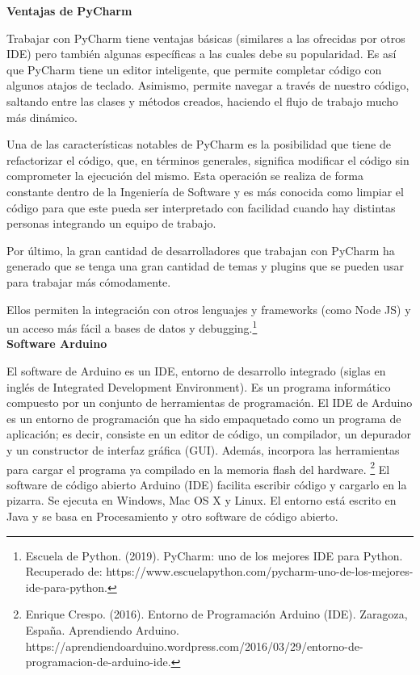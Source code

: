 \documentclass[12pt]{report}%
\begin{document}
\textbf {Ventajas de PyCharm}

Trabajar con PyCharm tiene ventajas básicas (similares a las ofrecidas por otros IDE) pero también algunas específicas a las cuales debe su popularidad. Es así que PyCharm tiene un editor inteligente, que permite completar código con algunos atajos de teclado. Asimismo, permite navegar a través de nuestro código, saltando entre las clases y métodos creados, haciendo el flujo de trabajo mucho más dinámico.

Una de las características notables de PyCharm es la posibilidad que tiene de refactorizar el código, que, en términos generales, significa modificar el código sin comprometer la ejecución del mismo.
Esta operación se realiza de forma constante dentro de la Ingeniería de Software y es más conocida como limpiar el código para que este pueda ser interpretado con facilidad cuando hay distintas personas integrando un equipo de trabajo.

Por último, la gran cantidad de desarrolladores que trabajan con PyCharm ha generado que se tenga una gran cantidad de temas y plugins que se pueden usar para trabajar más cómodamente.

Ellos permiten la integración con otros lenguajes y frameworks (como Node JS) y un acceso más fácil a bases de datos y debugging.\footnote{Escuela de Python. (2019). PyCharm: uno de los mejores IDE para Python. Recuperado de: https://www.escuelapython.com/pycharm-uno-de-los-mejores-ide-para-python.}\\


\textbf{Software Arduino}

El software de Arduino es un IDE, entorno de desarrollo integrado (siglas en inglés de Integrated Development Environment). Es un programa informático compuesto por un conjunto de herramientas de programación. El IDE de Arduino es un entorno de programación que ha sido empaquetado como un programa de aplicación; es decir, consiste en un editor de código, un compilador, un depurador y un constructor de interfaz gráfica (GUI). Además, incorpora las herramientas para cargar el programa ya compilado en la memoria flash del hardware. \footnote{Enrique Crespo. (2016). Entorno de Programación Arduino (IDE). Zaragoza, España. Aprendiendo Arduino. https://aprendiendoarduino.wordpress.com/2016/03/29/entorno-de-programacion-de-arduino-ide.}
El software de código abierto Arduino (IDE) facilita escribir código y cargarlo en la pizarra. Se ejecuta en Windows, Mac OS X y Linux. El entorno está escrito en Java y se basa en Procesamiento y otro software de código abierto. 
\end{document}
